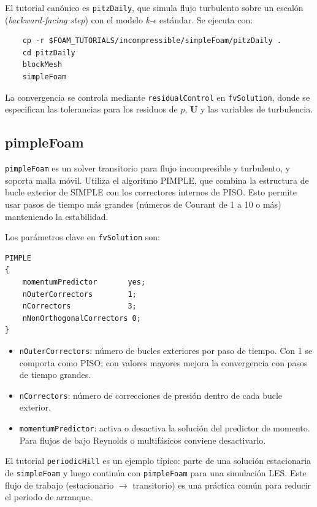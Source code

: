 El tutorial canónico es \texttt{pitzDaily}, que simula flujo turbulento sobre un escalón (\textit{backward-facing step}) con el modelo $k$-$\epsilon$ estándar. Se ejecuta con:
\begin{verbatim}
    cp -r $FOAM_TUTORIALS/incompressible/simpleFoam/pitzDaily .
    cd pitzDaily
    blockMesh
    simpleFoam
\end{verbatim}

La convergencia se controla mediante \texttt{residualControl} en \texttt{fvSolution}, donde se especifican las tolerancias para los residuos de $p$, $\mathbf{U}$ y las variables de turbulencia.

\subsection{pimpleFoam}

\texttt{pimpleFoam} es un solver transitorio para flujo incompresible y turbulento, y soporta malla móvil. Utiliza el algoritmo PIMPLE, que combina la estructura de bucle exterior de SIMPLE con los correctores internos de PISO. Esto permite usar pasos de tiempo más grandes (números de Courant de 1 a 10 o más) manteniendo la estabilidad.

Los parámetros clave en \texttt{fvSolution} son:
\begin{verbatim}
PIMPLE
{
    momentumPredictor       yes;
    nOuterCorrectors        1;
    nCorrectors             3;
    nNonOrthogonalCorrectors 0;
}
\end{verbatim}
\begin{itemize}
  \item \texttt{nOuterCorrectors}: número de bucles exteriores por paso de tiempo. Con 1 se comporta como PISO; con valores mayores mejora la convergencia con pasos de tiempo grandes.
  \item \texttt{nCorrectors}: número de correcciones de presión dentro de cada bucle exterior.
  \item \texttt{momentumPredictor}: activa o desactiva la solución del predictor de momento. Para flujos de bajo Reynolds o multifásicos conviene desactivarlo.
\end{itemize}

El tutorial \texttt{periodicHill} es un ejemplo típico: parte de una solución estacionaria de \texttt{simpleFoam} y luego continúa con \texttt{pimpleFoam} para una simulación LES. Este flujo de trabajo (estacionario $\to$ transitorio) es una práctica común para reducir el periodo de arranque.
